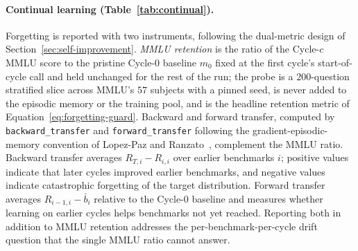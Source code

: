 \paragraph{Continual learning (Table~\ref{tab:continual}).}
Forgetting is reported with two instruments, following the dual-metric design of Section~\ref{sec:self-improvement}. \emph{MMLU retention} is the ratio of the Cycle-$c$ MMLU score to the pristine Cycle-0 baseline $m_{0}$ fixed at the first cycle's start-of-cycle call and held unchanged for the rest of the run; the probe is a $200$-question stratified slice across MMLU's $57$ subjects with a pinned seed, is never added to the episodic memory or the training pool, and is the headline retention metric of Equation~\ref{eq:forgetting-guard}. Backward and forward transfer, computed by \texttt{backward\_transfer} and \texttt{forward\_transfer} following the gradient-episodic-memory convention of Lopez-Paz and Ranzato~\cite{lopezpaz2017gradient}, complement the MMLU ratio. Backward transfer averages $R_{T, i} - R_{i, i}$ over earlier benchmarks $i$; positive values indicate that later cycles improved earlier benchmarks, and negative values indicate catastrophic forgetting of the target distribution. Forward transfer averages $R_{i-1, i} - \bar{b}_{i}$ relative to the Cycle-0 baseline and measures whether learning on earlier cycles helps benchmarks not yet reached. Reporting both in addition to MMLU retention addresses the per-benchmark-per-cycle drift question that the single MMLU ratio cannot answer.

